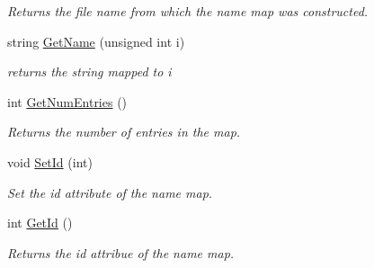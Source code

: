 \begin{DoxyCompactItemize}
\begin{DoxyCompactList}\small\item\em Returns the file name from which the name map was constructed. \item\end{DoxyCompactList}\item 
\hypertarget{class_name_map_a0ceabf530c3093d6fa163932c928d7bf}{
string \hyperlink{class_name_map_a0ceabf530c3093d6fa163932c928d7bf}{GetName} (unsigned int i)}
\label{class_name_map_a0ceabf530c3093d6fa163932c928d7bf}

\begin{DoxyCompactList}\small\item\em returns the string mapped to i \item\end{DoxyCompactList}\item 
\hypertarget{class_name_map_ab1922430c9e4d12e67b5f27edf9afd15}{
int \hyperlink{class_name_map_ab1922430c9e4d12e67b5f27edf9afd15}{GetNumEntries} ()}
\label{class_name_map_ab1922430c9e4d12e67b5f27edf9afd15}

\begin{DoxyCompactList}\small\item\em Returns the number of entries in the map. \item\end{DoxyCompactList}\item 
\hypertarget{class_name_map_a61afb305b470bab4e3c9e14279d6f1c5}{
void \hyperlink{class_name_map_a61afb305b470bab4e3c9e14279d6f1c5}{SetId} (int)}
\label{class_name_map_a61afb305b470bab4e3c9e14279d6f1c5}

\begin{DoxyCompactList}\small\item\em Set the id attribute of the name map. \item\end{DoxyCompactList}\item 
\hypertarget{class_name_map_a5ec2b743e894000de9dcc0c7cf198775}{
int \hyperlink{class_name_map_a5ec2b743e894000de9dcc0c7cf198775}{GetId} ()}
\label{class_name_map_a5ec2b743e894000de9dcc0c7cf198775}

\begin{DoxyCompactList}\small\item\em Returns the id attribue of the name map. \item\end{DoxyCompactList}\end{DoxyCompactItemize}

